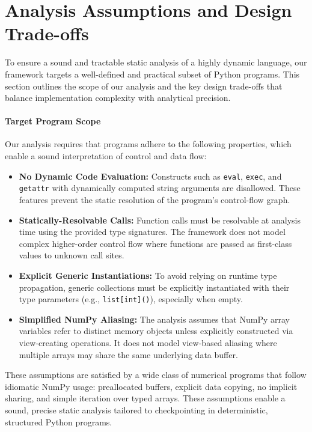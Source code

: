 \appendix
\section{Analysis Assumptions and Design Trade-offs}
\label{sec:appendix-assumptions}

To ensure a sound and tractable static analysis of a highly dynamic language, our framework targets a well-defined and practical subset of Python programs. This section outlines the scope of our analysis and the key design trade-offs that balance implementation complexity with analytical precision.

\paragraph{Target Program Scope}
Our analysis requires that programs adhere to the following properties, which enable a sound interpretation of control and data flow:
\begin{itemize}
    \item \textbf{No Dynamic Code Evaluation:} Constructs such as \texttt{eval}, \texttt{exec}, and \texttt{getattr} with dynamically computed string arguments are disallowed. These features prevent the static resolution of the program's control-flow graph.
    \item \textbf{Statically-Resolvable Calls:} Function calls must be resolvable at analysis time using the provided type signatures. The framework does not model complex higher-order control flow where functions are passed as first-class values to unknown call sites.
    \item \textbf{Explicit Generic Instantiations:} To avoid relying on runtime type propagation, generic collections must be explicitly instantiated with their type parameters (e.g., \texttt{list[int]()}), especially when empty.
    \item \textbf{Simplified NumPy Aliasing:} The analysis assumes that NumPy array variables refer to distinct memory objects unless explicitly constructed via view-creating operations. It does not model view-based aliasing where multiple arrays may share the same underlying data buffer.
\end{itemize}

These assumptions are satisfied by a wide class of numerical programs that follow idiomatic NumPy usage: preallocated buffers, explicit data copying, no implicit sharing, and simple iteration over typed arrays. These assumptions enable a sound, precise static analysis tailored to checkpointing in deterministic, structured Python programs.

